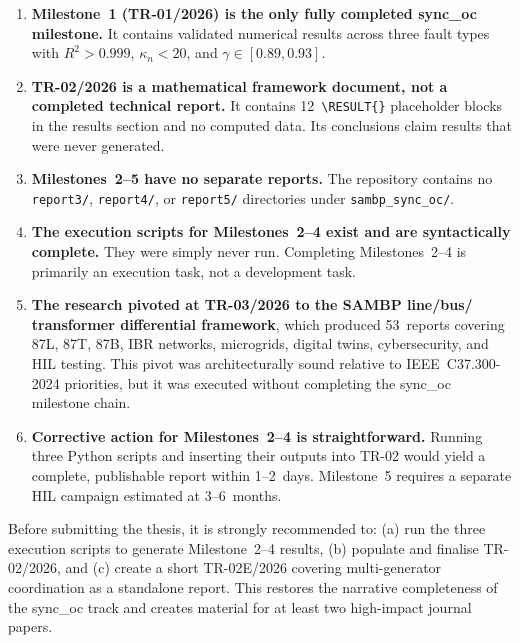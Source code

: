 \documentclass[12pt,a4paper]{article}
\begin{document}
\begin{enumerate}
  \item \textbf{Milestone~1 (TR-01/2026) is the only fully completed sync\_oc
        milestone.}  It contains validated numerical results across three fault
        types with $R^2 > 0.999$, $\kappa_n < 20$, and $\gamma \in [0.89, 0.93]$.

  \item \textbf{TR-02/2026 is a mathematical framework document, not a completed
        technical report.}  It contains 12~\texttt{\textbackslash RESULT\{\}}
        placeholder blocks in the results section and no computed data.  Its
        conclusions claim results that were never generated.

  \item \textbf{Milestones~2--5 have no separate reports.}  The repository
        contains no \texttt{report3/}, \texttt{report4/}, or \texttt{report5/}
        directories under \texttt{sambp\_sync\_oc/}.

  \item \textbf{The execution scripts for Milestones~2--4 exist and are
        syntactically complete.}  They were simply never run.  Completing
        Milestones~2--4 is primarily an execution task, not a development task.

  \item \textbf{The research pivoted at TR-03/2026 to the SAMBP line/bus/
        transformer differential framework}, which produced 53~reports covering
        87L, 87T, 87B, IBR networks, microgrids, digital twins, cybersecurity,
        and HIL testing.  This pivot was architecturally sound relative to
        IEEE~C37.300-2024 priorities, but it was executed without completing
        the sync\_oc milestone chain.

  \item \textbf{Corrective action for Milestones~2--4 is straightforward.}
        Running three Python scripts and inserting their outputs into TR-02
        would yield a complete, publishable report within 1--2~days.
        Milestone~5 requires a separate HIL campaign estimated at 3--6~months.
\end{enumerate}

\begin{recommendbox}[title={Priority Recommendation}]
Before submitting the thesis, it is strongly recommended to: (a) run the three
execution scripts to generate Milestone~2--4 results, (b) populate and finalise
TR-02/2026, and (c) create a short TR-02E/2026 covering multi-generator
coordination as a standalone report.  This restores the narrative completeness
of the sync\_oc track and creates material for at least two high-impact journal
papers.
\end{recommendbox}
\end{document}
